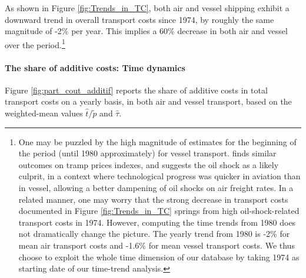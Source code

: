 \documentclass[a4paper,11pt]{article}
\begin{document}
As shown in Figure \ref{fig:Trends_in_TC}, both air and vessel shipping exhibit a downward trend in overall transport costs since 1974, by roughly the same magnitude of -2\% per year. This implies a 60\% decrease in both air and vessel over the period.\footnote{One may be puzzled by the high magnitude of estimates for the beginning of the period (until 1980 approximately) for vessel transport.
\cite{hummels2007} finds similar outcomes on tramp prices indexes, and suggests the oil shock as a likely culprit, in a context where technological progress was quicker in aviation than in vessel, allowing a better dampening of oil shocks on air freight rates.
In a related manner, one may worry that the strong decrease in transport costs documented in Figure \ref{fig:Trends_in_TC} springs from high oil-shock-related transport costs in 1974. However, computing the time trends from 1980 does not dramatically change the picture.
The yearly trend from 1980 is -2\% for mean air transport costs and -1.6\% for mean vessel transport costs.
We thus choose to exploit the whole time dimension of our database by taking 1974 as starting date of our time-trend analysis.}


\paragraph{The share of additive costs: Time dynamics} Figure \ref{fig:part_cout_additif} reports the share of additive costs in total transport costs on a yearly basis, in both air and vessel transport, based on the weighted-mean values $\widehat{t}/\widetilde{p}$ and $\widehat{\tau}$.
\end{document}
